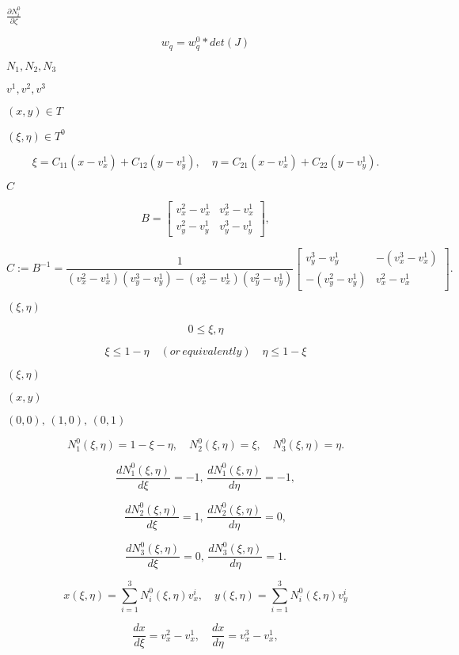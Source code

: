 \documentclass{article}
\begin{document}
$ \frac{\partial N^0_i} {\partial \zeta } $
\pagebreak

\[ w_q = w^0_q * det(J) \]
\pagebreak

$ N_1, N_2, N_3$
\pagebreak

$ v^1, v^2, v^3$
\pagebreak

$ (x,y) \in T $
\pagebreak

$ (\xi, \eta) \in T^0 $
\pagebreak

\[ \xi = C_{11} (x - v^1_x) + C_{12} (y - v^1_y), \quad \eta = C_{21} (x - v^1_x) + C_{22} (y - v^1_y). \]
\pagebreak

$ C$
\pagebreak

\[ B = \left[ {\begin{array}{cc} v^2_x - v^1_x & v^3_x - v^1_x \\ v^2_y - v^1_y & v^3_y - v^1_y \end{array}}\right], \]
\pagebreak

\[ C := B^{-1} = \frac{1}{(v^2_x - v^1_x)(v^3_y - v^1_y) - (v^3_x - v^1_x) (v^2_y - v^1_y)} \left[ {\begin{array}{cc} v^3_y - v^1_y & -(v^3_x - v^1_x) \\ -(v^2_y - v^1_y) & v^2_x - v^1_x \end{array}}\right]. \]
\pagebreak

$ (\xi, \eta)$
\pagebreak

\[ 0\leq \xi, \eta \]
\pagebreak

\[ \xi \leq 1 - \eta \quad (or\, equivalently) \quad \eta \leq 1 - \xi \]
\pagebreak

$ (\xi,\eta) $
\pagebreak

$(x,y) $
\pagebreak

$ (0,0), \, (1,0), \, (0,1) $
\pagebreak

\[N^0_1(\xi, \eta) = 1- \xi - \eta, \quad N^0_2(\xi, \eta) = \xi, \quad N^0_3(\xi, \eta) = \eta. \]
\pagebreak

\[\frac{d N^0_1(\xi, \eta)}{d\xi} = -1, \, \frac{d N^0_1(\xi, \eta) }{d\eta} = -1, \]
\pagebreak

\[\frac{d N^0_2(\xi, \eta)}{d\xi} = 1, \, \frac{d N^0_2(\xi, \eta)}{d\eta} = 0, \]
\pagebreak

\[\frac{d N^0_3(\xi, \eta)}{d\xi} = 0, \, \frac{d N^0_3(\xi, \eta)}{d\eta} = 1. \]
\pagebreak

\[ x(\xi, \eta) = \sum_{i=1}^3 N^0_i(\xi, \eta) v^i_x, \quad y(\xi, \eta) = \sum_{i=1}^3 N^0_i(\xi, \eta) v^i_y \]
\pagebreak

\[ \frac{dx}{d\xi} = v^2_x - v^1_x, \quad \frac{dx}{d\eta} = v^3_x - v^1_x, \]
\pagebreak
\end{document}
